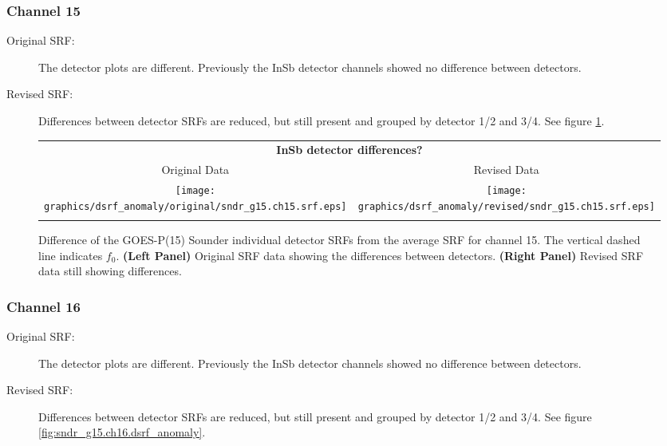 \subsubsection{Channel 15}
\begin{description}
  \item[Original SRF:] The detector plots are different. Previously the InSb detector channels showed no difference between detectors.
  \item[Revised SRF:]  Differences between detector SRFs are reduced, but still present and grouped by detector 1/2 and 3/4. See figure \ref{fig:sndr_g15.ch15.dsrf_anomaly}.
\end{description}

\begin{figure}[htp]
  \centering
  \begin{tabular}{c c}
    \multicolumn{2}{c}{\textsf{\bfseries InSb detector differences?}} \\
    \hspace{1.5em}\textsf{Original Data} &
    \hspace{1.5em}\textsf{Revised Data} \\
    \texttt{[image: graphics/dsrf\_anomaly/original/sndr\_g15.ch15.srf.eps]} &
    \texttt{[image: graphics/dsrf\_anomaly/revised/sndr\_g15.ch15.srf.eps]} \\\\
  \end{tabular}
  \caption{Difference of the GOES-P(15) Sounder individual detector SRFs from the average SRF for channel 15. The vertical dashed line indicates $f_0$. \textbf{(Left Panel)} Original SRF data showing the differences between detectors. \textbf{(Right Panel)} Revised SRF data still showing differences.}
  \label{fig:sndr_g15.ch15.dsrf_anomaly}
\end{figure}

\subsubsection{Channel 16}
\begin{description}
  \item[Original SRF:] The detector plots are different. Previously the InSb detector channels showed no difference between detectors.
  \item[Revised SRF:]  Differences between detector SRFs are reduced, but still present and grouped by detector 1/2 and 3/4. See figure \ref{fig:sndr_g15.ch16.dsrf_anomaly}.
\end{description}

